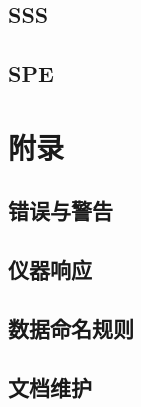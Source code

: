 \chapter{SSS}





















\chapter{SPE}












\part{附录}
\appendix
\chapter{错误与警告}




\chapter{仪器响应}
\label{chap:resp}



\chapter{数据命名规则}
\label{chap:naming}

\chapter{文档维护}



